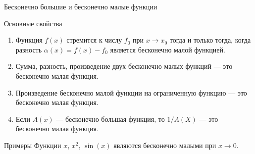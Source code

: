 \documentclass[8pt]{beamer}
\begin{document}

\begin{frame}{Бесконечно большие и бесконечно малые функции}
\begin{block}{Основные свойства}
\begin{enumerate}
\item
Функция $f(x)$ стремится к числу $f_0$ при $x\to x_0$ тогда и только тогда, когда разность $\alpha(x)=f(x) - f_0$ является бесконечно малой функцией.
\item Сумма, разность, произведение двух бесконечно малых функций --- это бесконечно малая функция.
\item Произведение бесконечно малой функции на ограниченную функцию --- это бесконечно малая функция.
\item Если $A(x)$ --- бесконечно большая функция, то $1/A(X)$ --- это бесконечно малая функция.
\end{enumerate}
\end{block}
\begin{block}{Примеры}
Функции $x$, $x^2$, $\sin(x)$ являются бесконечно малыми при $x\to0$.
\end{block}
\end{frame}
\end{document}
